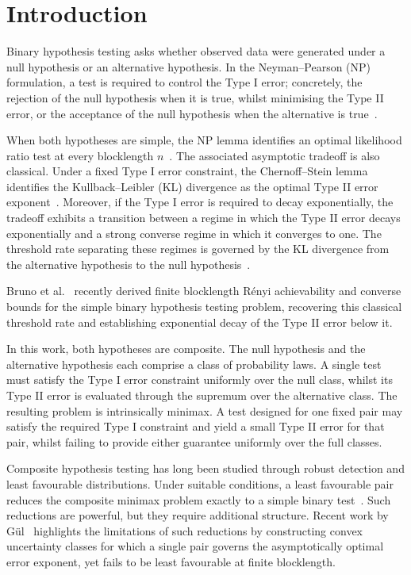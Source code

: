 \documentclass[journal,12pt,draftclsnofoot,onecolumn]{IEEEtran}
\begin{document}
\section{Introduction}
\label{sec:introduction}

Binary hypothesis testing asks whether observed data were generated under a null hypothesis or an alternative hypothesis. In the Neyman--Pearson (NP) formulation, a test is required to control the Type I error; concretely, the rejection of the null hypothesis when it is true, whilst minimising the Type II error, or the acceptance of the null hypothesis when the alternative is true~\cite{neyman1933testing,lehmann2005testing}. 

When both hypotheses are simple, the NP lemma identifies an optimal likelihood ratio test at every blocklength $n$~\cite{neyman1933testing}. The associated asymptotic tradeoff is also classical. Under a fixed Type I error constraint, the Chernoff--Stein lemma identifies the Kullback--Leibler (KL) divergence as the optimal Type II error exponent~\cite{cover2006elements}. Moreover, if the Type I error is required to decay exponentially, the tradeoff exhibits a transition between a regime in which the Type II error decays exponentially and a strong converse regime in which it converges to one. The threshold rate separating these regimes is governed by the KL divergence from the alternative hypothesis to the null hypothesis~\cite{blahut1974hypothesis,han2002strong}.

Bruno et al.~\cite{bruno2026finite} recently derived finite blocklength R\'enyi achievability and converse bounds for the simple binary hypothesis testing problem, recovering this classical threshold rate and establishing exponential decay of the Type II error below it.

In this work, both hypotheses are composite. The null hypothesis and the alternative hypothesis each comprise a class of probability laws. A single test must satisfy the Type I error constraint uniformly over the null class, whilst its Type II error is evaluated through the supremum over the alternative class. The resulting problem is intrinsically minimax. A test designed for one fixed pair may satisfy the required Type I constraint and yield a small Type II error for that pair, whilst failing to provide either guarantee uniformly over the full classes.

Composite hypothesis testing has long been studied through robust detection and least favourable distributions. Under suitable conditions, a least favourable pair reduces the composite minimax problem exactly to a simple binary test~\cite{huber1965robust,verdu2003minimax,fauss2021minimax}. Such reductions are powerful, but they require additional structure. Recent work by G\"ul~\cite{gul2026structural} highlights the limitations of such reductions by constructing convex uncertainty classes for which a single pair governs the asymptotically optimal error exponent, yet fails to be least favourable at finite blocklength.
\end{document}

